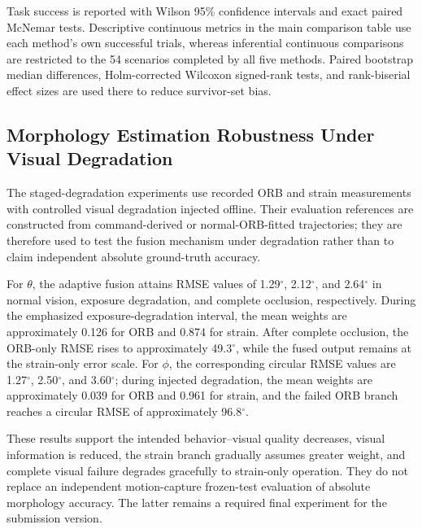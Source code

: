 \documentclass[journal,twoside]{IEEEtran}
\begin{document}
Task success is reported with Wilson 95\% confidence intervals and exact paired McNemar tests. Descriptive continuous metrics in the main comparison table use each method's own successful trials, whereas inferential continuous comparisons are restricted to the 54 scenarios completed by all five methods. Paired bootstrap median differences, Holm-corrected Wilcoxon signed-rank tests, and rank-biserial effect sizes are used there to reduce survivor-set bias.

\subsection{Morphology Estimation Robustness Under Visual Degradation}
The staged-degradation experiments use recorded ORB and strain measurements with controlled visual degradation injected offline. Their evaluation references are constructed from command-derived or normal-ORB-fitted trajectories; they are therefore used to test the fusion mechanism under degradation rather than to claim independent absolute ground-truth accuracy.

For $\theta$, the adaptive fusion attains RMSE values of 1.29$^\circ$, 2.12$^\circ$, and 2.64$^\circ$ in normal vision, exposure degradation, and complete occlusion, respectively. During the emphasized exposure-degradation interval, the mean weights are approximately 0.126 for ORB and 0.874 for strain. After complete occlusion, the ORB-only RMSE rises to approximately 49.3$^\circ$, while the fused output remains at the strain-only error scale. For $\phi$, the corresponding circular RMSE values are 1.27$^\circ$, 2.50$^\circ$, and 3.60$^\circ$; during injected degradation, the mean weights are approximately 0.039 for ORB and 0.961 for strain, and the failed ORB branch reaches a circular RMSE of approximately 96.8$^\circ$.

These results support the intended behavior--visual quality decreases, visual information is reduced, the strain branch gradually assumes greater weight, and complete visual failure degrades gracefully to strain-only operation. They do not replace an independent motion-capture frozen-test evaluation of absolute morphology accuracy. The latter remains a required final experiment for the submission version.
\end{document}
